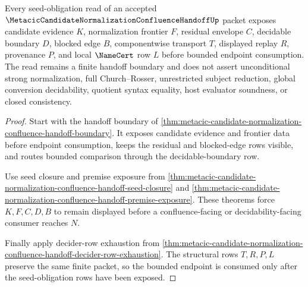 \begin{theorem}
\label{thm:metacic-candidate-normalization-confluence-handoff-seed-obligations}
Every seed-obligation read of an accepted $\MetacicCandidateNormalizationConfluenceHandoffUp$ packet exposes candidate evidence $K$, normalization frontier $F$, residual envelope $C$, decidable boundary $D$, blocked edge $B$, componentwise transport $T$, displayed replay $R$, provenance $P$, and local $\NameCert$ row $L$ before bounded endpoint consumption. The read remains a finite handoff boundary and does not assert unconditional strong normalization, full Church--Rosser, unrestricted subject reduction, global conversion decidability, quotient syntax equality, host evaluator soundness, or closed consistency.
\end{theorem}
\begin{proof}
Start with the handoff boundary of \autoref{thm:metacic-candidate-normalization-confluence-handoff-boundary}. It exposes candidate evidence and frontier data before endpoint consumption, keeps the residual and blocked-edge rows visible, and routes bounded comparison through the decidable-boundary row.

Use seed closure and premise exposure from \autoref{thm:metacic-candidate-normalization-confluence-handoff-seed-closure} and \autoref{thm:metacic-candidate-normalization-confluence-handoff-premise-exposure}. These theorems force $K,F,C,D,B$ to remain displayed before a confluence-facing or decidability-facing consumer reaches $N$.

Finally apply decider-row exhaustion from \autoref{thm:metacic-candidate-normalization-confluence-handoff-decider-row-exhaustion}. The structural rows $T,R,P,L$ preserve the same finite packet, so the bounded endpoint is consumed only after the seed-obligation rows have been exposed.
\end{proof}

